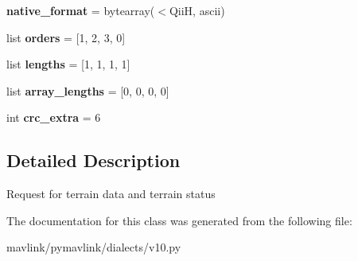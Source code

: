 \begin{DoxyCompactItemize}
{\bfseries native\+\_\+format} = bytearray(\textquotesingle{}$<$QiiH\textquotesingle{}, \textquotesingle{}ascii\textquotesingle{})
\item 
\mbox{\label{classpymavlink_1_1dialects_1_1v10_1_1MAVLink__terrain__request__message_a91c0b2159643a6ae3b130312bf731ae1}} 
list {\bfseries orders} = \mbox{[}1, 2, 3, 0\mbox{]}
\item 
\mbox{\label{classpymavlink_1_1dialects_1_1v10_1_1MAVLink__terrain__request__message_a4ea4b2d1fb9758c55b58f6240e580b74}} 
list {\bfseries lengths} = \mbox{[}1, 1, 1, 1\mbox{]}
\item 
\mbox{\label{classpymavlink_1_1dialects_1_1v10_1_1MAVLink__terrain__request__message_a4ef155e600c24ef938e76fc741235197}} 
list {\bfseries array\+\_\+lengths} = \mbox{[}0, 0, 0, 0\mbox{]}
\item 
\mbox{\label{classpymavlink_1_1dialects_1_1v10_1_1MAVLink__terrain__request__message_aae50194cb3f5e1de05db13ad1c94cec7}} 
int {\bfseries crc\+\_\+extra} = 6
\end{DoxyCompactItemize}


\subsection{Detailed Description}
\begin{DoxyVerb}Request for terrain data and terrain status
\end{DoxyVerb}
 

The documentation for this class was generated from the following file\+:\begin{DoxyCompactItemize}
\item 
mavlink/pymavlink/dialects/v10.\+py\end{DoxyCompactItemize}
